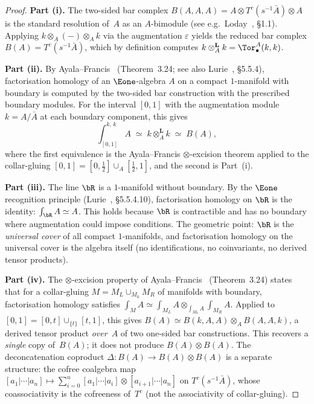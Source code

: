 \begin{proof}
\textbf{Part (i).}
The two-sided bar complex $B(A,A,A) = A \otimes T^c(s^{-1}\bar{A})
\otimes A$ is the standard resolution of~$A$ as an $A$-bimodule
(see e.g.\ Loday~\cite{loday1992cyclic}, \S1.1).
Applying $k \otimes_A (-) \otimes_A k$ via the augmentation
$\varepsilon$ yields the reduced bar complex
$B(A) = T^c(s^{-1}\bar{A})$, which by definition computes
$k \otimes_A^{\mathbf{L}} k =
\Tor_\bullet^A(k,k)$.

\textbf{Part (ii).}
By Ayala--Francis~\cite{AF15} (Theorem~3.24; see also
Lurie~\cite{HA}, \S5.5.4), factorisation homology of an
$\Eone$-algebra $A$ on a compact $1$-manifold with boundary
is computed by the two-sided bar construction with the
prescribed boundary modules.
For the interval $[0,1]$ with the augmentation module
$k = A/\bar{A}$ at each boundary component, this gives
\[
 \int_{[0,1]}^{k,\,k} A
 \;\simeq\;
 k \otimes_A^{\mathbf{L}} k
 \;\simeq\;
 B(A),
\]
where the first equivalence is the Ayala--Francis
$\otimes$-excision theorem applied to the collar-gluing
$[0,1] = [0,\tfrac{1}{2}] \cup_{A} [\tfrac{1}{2},1]$,
and the second is Part~(i).

\textbf{Part (iii).}
The line $\bR$ is a $1$-manifold without boundary.
By the $\Eone$ recognition principle
(Lurie~\cite{HA}, \S5.5.4.10), factorisation homology
on $\bR$ is the identity:
$\int_{\bR} A \simeq A$.
This holds because $\bR$ is contractible and has no
boundary where augmentation could impose conditions.
The geometric point: $\bR$ is the \emph{universal cover}
of all compact $1$-manifolds, and factorisation homology
on the universal cover is the algebra itself (no
identifications, no coinvariants, no derived tensor
products).

\textbf{Part (iv).}
The $\otimes$-excision property of
Ayala--Francis~\cite{AF15} (Theorem~3.24) states that
for a collar-gluing $M = M_L \cup_{M_0} M_R$ of manifolds
with boundary, factorisation homology satisfies
$\int_M A \simeq \int_{M_L} A \otimes_{\int_{M_0} A}
\int_{M_R} A$.
Applied to $[0,1] = [0,t] \cup_{\{t\}} [t,1]$, this gives
$B(A) \simeq B(k,A,A) \otimes_A B(A,A,k)$, a derived tensor
product \emph{over}~$A$ of two one-sided bar constructions.
This recovers a \emph{single} copy of~$B(A)$; it does not
produce $B(A) \otimes B(A)$.
The deconcatenation coproduct $\Delta \colon B(A) \to
B(A) \otimes B(A)$ is a separate structure: the cofree
coalgebra map
$[a_1|\cdots|a_n] \mapsto \sum_{i=0}^{n}
[a_1|\cdots|a_i] \otimes [a_{i+1}|\cdots|a_n]$
on $T^c(s^{-1}\bar{A})$, whose coassociativity is
the cofreeness of~$T^c$ (not the associativity of
collar-gluing).
\end{proof}

